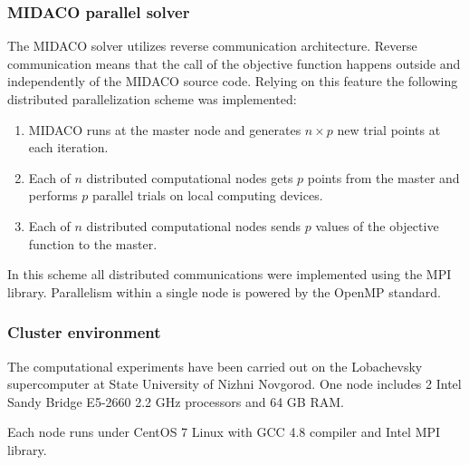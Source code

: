\documentclass[aspectratio=1610]{beamer}
\begin{document}
\begin{frame}
  \frametitle{MIDACO parallel solver}
  The MIDACO solver utilizes reverse communication architecture.
  Reverse communication means that the call of the objective function happens outside and
  independently of the MIDACO source code.
  Relying on this feature the following distributed parallelization scheme was implemented:
  \begin{enumerate}
    \item MIDACO runs at the master node and generates \(n \times p\) new trial points at each
  iteration.
    \item Each of \(n\) distributed computational nodes gets \(p\) points from the master and performs
  \(p\) parallel trials on local computing devices.
    \item Each of \(n\) distributed computational nodes sends \(p\) values of the objective function to
  the master.
  \end{enumerate}

  In this scheme all distributed communications were implemented using the MPI library.
  Parallelism within a single node is powered by the OpenMP standard.
\end{frame}

\begin{frame}
  \frametitle{Cluster environment}
  \begin{center}
  The computational experiments have been carried out on the Lobachevsky supercomputer at  State University of Nizhni Novgorod.
  One node includes 2 Intel Sandy Bridge E5-2660 2.2 GHz processors and 64 GB RAM.

  Each node runs under CentOS 7 Linux with GCC 4.8 compiler and Intel MPI library.
\end{center}
\end{frame}
\end{document}
